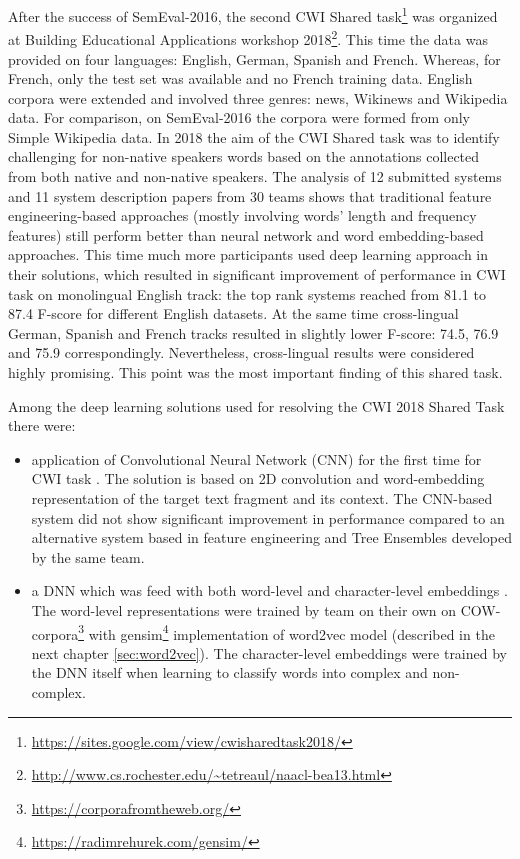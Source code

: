 After the success of SemEval-2016, the second CWI Shared task\footnote{\url{https://sites.google.com/view/cwisharedtask2018/}} was organized at Building Educational Applications workshop 2018\footnote{\url{http://www.cs.rochester.edu/~tetreaul/naacl-bea13.html}}. This time the data was provided on four languages: English, German, Spanish and French. Whereas, for French, only the test set was available and no French training data. English corpora were extended and involved three genres: news, Wikinews and Wikipedia data. For comparison, on SemEval-2016 the corpora were formed from only Simple Wikipedia data. In 2018 the aim of the CWI Shared
task was to identify challenging for non-native speakers words based on the annotations collected from both native and non-native speakers. 
The analysis \citep{Yimam-BEA2018} of 12 submitted systems and 11 system description papers from 30 teams shows that traditional feature engineering-based approaches (mostly involving words' length and frequency features) still perform better than neural network and word embedding-based approaches. This time much more participants used deep learning approach in their solutions, which resulted in significant improvement of performance in CWI task on monolingual English track: the top rank systems reached from 81.1 to 87.4 F-score for different English datasets. At the same time cross-lingual German, Spanish and French tracks resulted in slightly lower F-score: 74.5, 76.9 and 75.9 correspondingly. Nevertheless, cross-lingual results were considered highly promising. This point was the most important finding of this shared task. 

Among the deep learning solutions used for resolving the CWI 2018 Shared Task  there were:
\begin{itemize}
    \item application of Convolutional Neural Network (CNN) for the first time for CWI task \citep{Aroyehun-BEA2018}. The solution is based on 2D convolution and word-embedding representation of the target text fragment and its context. The CNN-based system did not show significant improvement in performance compared to an alternative system based in feature engineering and Tree Ensembles developed by the same team. 
    
    \item a DNN which was feed with both word-level and character-level embeddings \citep{DeHertog-ACL2018}. The word-level representations were trained by team on their own on COW-corpora\footnote{\url{https://corporafromtheweb.org/}} with gensim\footnote{\url{https://radimrehurek.com/gensim/}} implementation of word2vec model (described in the next chapter \ref{sec:word2vec}). The character-level embeddings were trained by the DNN itself when learning to classify words into complex and non-complex.
\end{itemize}

